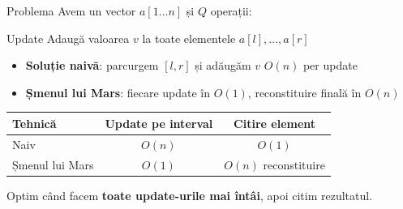 \documentclass{beamer}
\begin{document}
\begin{frame}[shrink]{Problema}
  Avem un vector $a[1 \ldots n]$ și $Q$ operații:
  \begin{block}{Update}
    Adaugă valoarea $v$ la toate elementele $a[l], \ldots, a[r]$
  \end{block}

  \smallskip
  \begin{itemize}
    \item \textbf{Soluție naivă}: parcurgem $[l, r]$ și adăugăm $v$ \textemdash{} $O(n)$ per update
    \item \textbf{Șmenul lui Mars}: fiecare update în $O(1)$, reconstituire finală în $O(n)$
  \end{itemize}

  \smallskip
  \begin{center}
  \begin{tabular}{lcc}
    \toprule
    Tehnică & Update pe interval & Citire element \\
    \midrule
    Naiv & $O(n)$ & $O(1)$ \\
    Șmenul lui Mars & $O(1)$ & $O(n)$ reconstituire \\
    \bottomrule
  \end{tabular}
  \end{center}
  \medskip
  Optim când facem \textbf{toate update-urile mai întâi}, apoi citim rezultatul.
\end{frame}
\end{document}
